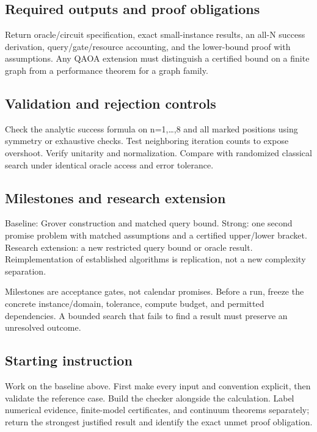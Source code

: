 \documentclass[
  11pt,
]{article}
\begin{document}
\subsection{Required outputs and proof obligations}

Return oracle/circuit specification, exact small-instance results, an
all-N success derivation, query/gate/resource accounting, and the
lower-bound proof with assumptions. Any QAOA extension must distinguish
a certified bound on a finite graph from a performance theorem for a
graph family.

\subsection{Validation and rejection controls}

Check the analytic success formula on n=1,\ldots,8 and all marked
positions using symmetry or exhaustive checks. Test neighboring
iteration counts to expose overshoot. Verify unitarity and
normalization. Compare with randomized classical search under identical
oracle access and error tolerance.

\subsection{Milestones and research extension}

Baseline: Grover construction and matched query bound. Strong: one
second promise problem with matched assumptions and a certified
upper/lower bracket. Research extension: a new restricted query bound or
oracle result. Reimplementation of established algorithms is
replication, not a new complexity separation.

Milestones are acceptance gates, not calendar promises. Before a run,
freeze the concrete instance/domain, tolerance, compute budget, and
permitted dependencies. A bounded search that fails to find a result
must preserve an unresolved outcome.

\subsection{Starting instruction}

Work on the baseline above. First make every input and convention
explicit, then validate the reference case. Build the checker alongside
the calculation. Label numerical evidence, finite-model certificates,
and continuum theorems separately; return the strongest justified result
and identify the exact unmet proof obligation.
\end{document}
